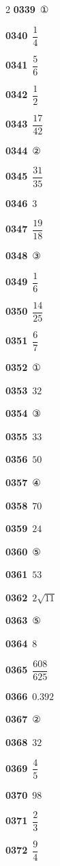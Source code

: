 \documentclass[10pt,a4paper]{article}
\begin{document}
\begin{multicols}{2}
\noindent\textbf{0339}\ ①\par
\noindent\textbf{0340}\ $\dfrac{1}{4}$\par
\noindent\textbf{0341}\ $\dfrac{5}{6}$\par
\noindent\textbf{0342}\ $\dfrac{1}{2}$\par
\noindent\textbf{0343}\ $\dfrac{17}{42}$\par
\noindent\textbf{0344}\ ②\par
\noindent\textbf{0345}\ $\dfrac{31}{35}$\par
\noindent\textbf{0346}\ $3$\par
\noindent\textbf{0347}\ $\dfrac{19}{18}$\par
\noindent\textbf{0348}\ ③\par
\noindent\textbf{0349}\ $\dfrac{1}{6}$\par
\noindent\textbf{0350}\ $\dfrac{14}{25}$\par
\noindent\textbf{0351}\ $\dfrac{6}{7}$\par
\noindent\textbf{0352}\ ①\par
\noindent\textbf{0353}\ $32$\par
\noindent\textbf{0354}\ ③\par
\noindent\textbf{0355}\ $33$\par
\noindent\textbf{0356}\ $50$\par
\noindent\textbf{0357}\ ④\par
\noindent\textbf{0358}\ $70$\par
\noindent\textbf{0359}\ $24$\par
\noindent\textbf{0360}\ ⑤\par
\noindent\textbf{0361}\ $53$\par
\noindent\textbf{0362}\ $2\sqrt{11}$\par
\noindent\textbf{0363}\ ⑤\par
\noindent\textbf{0364}\ $8$\par
\noindent\textbf{0365}\ $\dfrac{608}{625}$\par
\noindent\textbf{0366}\ $0.392$\par
\noindent\textbf{0367}\ ②\par
\noindent\textbf{0368}\ $32$\par
\noindent\textbf{0369}\ $\dfrac{4}{5}$\par
\noindent\textbf{0370}\ $98$\par
\noindent\textbf{0371}\ $\dfrac{2}{3}$\par
\noindent\textbf{0372}\ $\dfrac{9}{4}$\par

\end{multicols}
\end{document}
